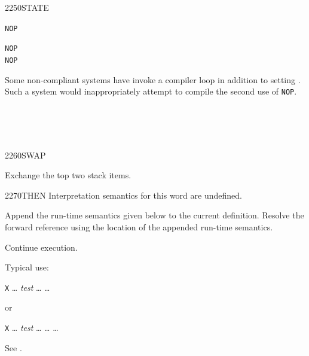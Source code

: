 \begin{worddef}{2250}{STATE}
\begin{rationale}
		\tab \word{:} \texttt{NOP}~
			\word{:}  \word{;} 
		\word{;}

		\tab \texttt{NOP}  \\
		\tab \texttt{NOP} 

		Some non-compliant systems have \word{]} invoke a
		compiler loop in addition to setting . Such a
		system would inappropriately attempt to compile the second
		use of \texttt{NOP}.
	\end{rationale}

	\begin{testing} %
		 \\
		 \\
		 \\
	\end{testing}
\end{worddef}


\begin{worddef}{2260}{SWAP}
\item {}

	Exchange the top two stack items.

	\begin{testing} %
	\end{testing}
\end{worddef}


\begin{worddef}{2270}{THEN}
\interpret
	Interpretation semantics for this word are undefined.

\compile

	Append the run-time semantics given below to the current
	definition. Resolve the forward reference  using
	the location of the appended run-time semantics.

\runtime
	\stack{}{}

	Continue execution.


	\begin{rationale} %
		Typical use:

		\tab \word{:} \texttt{X} {\ldots}
			\emph{test}  {\ldots} 
			{\ldots} \word{;}

		or

		\tab \word{:} \texttt{X} {\ldots}
			\emph{test}  {\ldots}  {\ldots} 
			{\ldots} \word{;}
	\end{rationale}

	\begin{testing} %
		See .
	\end{testing}
\end{worddef}


